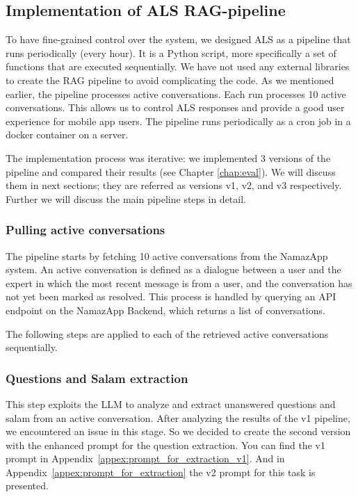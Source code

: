 \subsection{Implementation of ALS RAG-pipeline}

To have fine-grained control over the system, we designed ALS as a pipeline that runs periodically (every hour). It is a Python script, more specifically a set of functions that are executed sequentially. We have not used any external libraries to create the RAG pipeline to avoid complicating the code. As we mentioned earlier, the pipeline processes active conversations. Each run processes 10 active conversations. This allows us to control ALS responses and provide a good user experience for mobile app users. The pipeline runs periodically as a cron job in a docker container on a server.

The implementation process was iterative: we implemented 3 versions of the pipeline and compared their results (see Chapter \ref{chap:eval}). We will discuss them in next sections; they are referred as versions v1, v2, and v3 respectively.
Further we will discuss the main pipeline steps in detail.

\subsubsection{Pulling active conversations}

The pipeline starts by fetching 10 active conversations from the NamazApp system. An active conversation is defined as a dialogue between a user and the expert in which the most recent message is from a user, and the conversation has not yet been marked as resolved. This process is handled by querying an API endpoint on the NamazApp Backend, which returns a list of conversations.

The following steps are applied to each of the retrieved active conversations sequentially.

\subsubsection{Questions and Salam extraction}

This step exploits the LLM to analyze and extract unanswered questions and salam from an active conversation. After analyzing the results of the v1 pipeline, we encountered an issue in this stage. So we decided to create the second version with the enhanced prompt for the question extraction. You can find the v1 prompt in Appendix~\ref{appex:prompt_for_extraction_v1}. And in Appendix~\ref{appex:prompt_for_extraction} the v2 prompt for this task is presented. 

